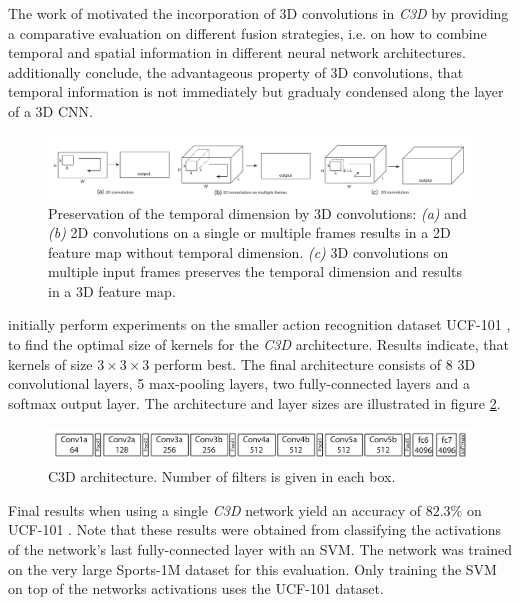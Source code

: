 The work of \textcite{karpathy_large-scale_2014} motivated the incorporation of 3D convolutions in \textit{C3D} by providing a comparative evaluation on different fusion strategies, i.e. on how to combine temporal and spatial information in different neural network architectures.
\textcite{tran_learning_2015} additionally conclude, the advantageous property of 3D convolutions, that temporal information is not immediately but gradualy condensed along the layer of a 3D CNN.

\begin{figure}[H]
    \centering
    \includegraphics[width=\textwidth]{img_related/c3d_2dconv3dconv}
    \caption{Preservation of the temporal dimension by 3D convolutions: \textit{(a)} and \textit{(b)} 2D convolutions on a single or multiple frames results in a 2D feature map without temporal dimension. \textit{(c)} 3D convolutions on multiple input frames preserves the temporal dimension and results in a 3D feature map. \cite{tran_learning_2015}}
    \label{fig:c3d_2dconv3dconv}
\end{figure}

\textcite{tran_learning_2015} initially perform experiments on the smaller action recognition dataset UCF-101 \cite{soomro_ucf101:_2012}, to find the optimal size of kernels for the \textit{C3D} architecture. Results indicate, that kernels of size $3 \times 3 \times 3$ perform best.
The final architecture consists of 8 3D convolutional layers, 5 max-pooling layers, two fully-connected layers and a softmax output layer.
The architecture and layer sizes are illustrated in figure \ref{fig:c3d_architecture}.

\begin{figure}[H]
    \centering
    \includegraphics[width=\textwidth]{img_related/c3d_architecture}
    \caption{C3D architecture. Number of filters is given in each box. \cite{tran_learning_2015}}
    \label{fig:c3d_architecture}
\end{figure}

Final results when using a single \textit{C3D} network yield an accuracy of $82.3\%$ on UCF-101 \cite{soomro_ucf101:_2012}.
Note that these results were obtained from classifying the activations of the network's last fully-connected layer with an SVM.
The network was trained on the very large Sports-1M dataset \cite{karpathy_large-scale_2014} for this evaluation.
Only training the SVM on top of the networks activations uses the UCF-101 dataset.

